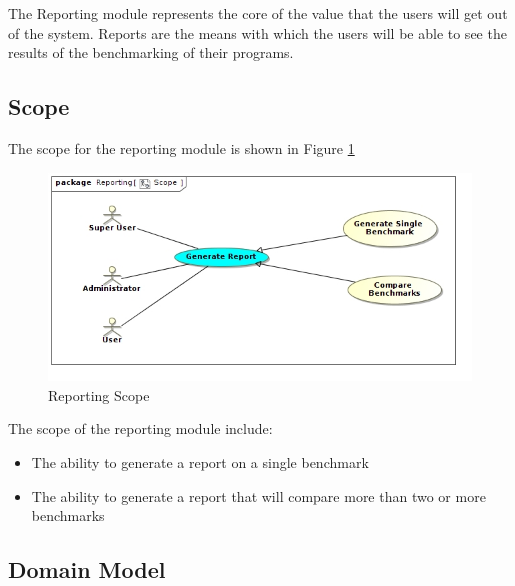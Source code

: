 The Reporting module represents the core of the value that the users will
get out of the system. Reports are the means with which the users will
be able to see the results of the benchmarking of their programs.

\subsection{Scope}
The scope for the reporting module is shown in Figure \ref{Reporting Scope}
\begin{figure}[H]
  \begin{center}
  \includegraphics[scale=0.7]{../Diagrams and Charts/Reporting/Scope.jpg}
  \caption{Reporting Scope}
  \end{center}
  \label{Reporting Scope}
\end{figure}

The scope of the reporting module include:
\begin{itemize}
	\item The ability to generate a report on a single benchmark
	\item The ability to generate a report that will compare more than
	two or more benchmarks
\end{itemize}

\subsection{Domain Model}
